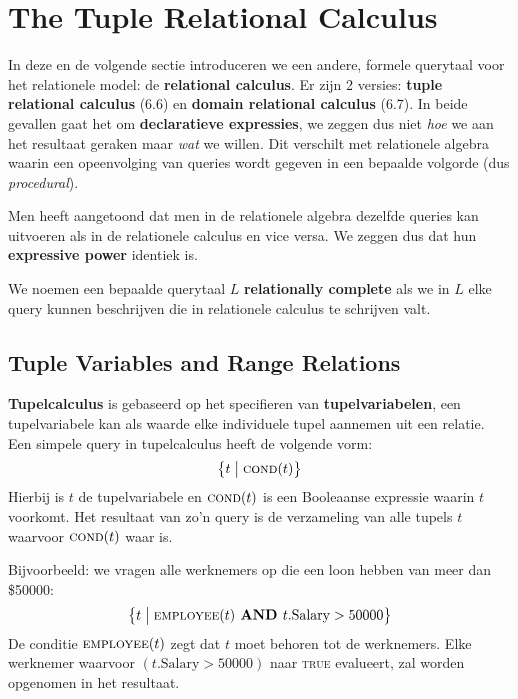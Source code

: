 \section{The Tuple Relational Calculus}
In deze en de volgende sectie introduceren we een andere, formele querytaal voor het relationele model: de \textbf{relational calculus}. Er zijn 2 versies: \textbf{tuple relational calculus} (6.6) en \textbf{domain relational calculus} (6.7). In beide gevallen gaat het om \textbf{declaratieve expressies}, we zeggen dus niet \textit{hoe} we aan het resultaat geraken maar \textit{wat} we willen. Dit verschilt met relationele algebra waarin een opeenvolging van queries wordt gegeven in een bepaalde volgorde (dus \textit{procedural}).

Men heeft aangetoond dat men in de relationele algebra dezelfde queries kan uitvoeren als in de relationele calculus en vice versa. We zeggen dus dat hun \textbf{expressive power} identiek is.

We noemen een bepaalde querytaal $L$ \textbf{relationally complete} als we in $L$ elke query kunnen beschrijven die in relationele calculus te schrijven valt.


\subsection{Tuple Variables and Range Relations}
\textbf{Tupelcalculus} is gebaseerd op het specifieren van \textbf{tupelvariabelen}, een tupelvariabele kan als waarde elke individuele tupel aannemen uit een relatie. Een simpele query in tupelcalculus heeft de volgende vorm:
\vspace{-2mm}
\[ \big\{ t \bigm| \textsc{cond}(t) \big\} \]
Hierbij is $t$ de tupelvariabele en $\textsc{cond}(t)$ is een Booleaanse expressie waarin $t$ voorkomt. Het resultaat van zo'n query is de verzameling van alle tupels $t$ waarvoor $\textsc{cond}(t)$ waar is.

Bijvoorbeeld: we vragen alle werknemers op die een loon hebben van meer dan \$50000:
\vspace{-2mm}
\[ \big\{ t \bigm| \textsc{employee}(t) \textbf{ AND } t.\text{Salary} > 50000 \big\} \]
De conditie $\textsc{employee}(t)$ zegt dat $t$ moet behoren tot de werknemers. Elke werknemer waarvoor $(t.\text{Salary} > 50000)$ naar \textsc{true} evalueert, zal worden opgenomen in het resultaat.

